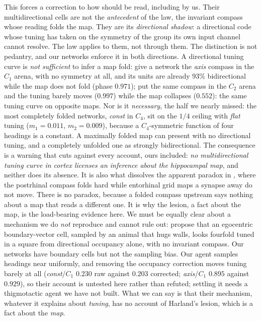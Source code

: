 \documentclass[9pt,lineno]{elife}
\begin{document}
This forces a correction to how \citet{zhang2022} should be read, including by us. Their
multidirectional cells are not the \emph{antecedent} of the law, the invariant compass whose reading
folds the map. They are its \emph{directional shadow}: a directional code whose tuning has taken on the
symmetry of the group its own input channel cannot resolve. The law applies to them, not through them.
The distinction is not pedantry, and our networks enforce it in both directions. A directional tuning
curve is \emph{not sufficient} to infer a map fold: give a network the \textit{axis} compass in the
$C_1$ arena, with no symmetry at all, and its units are already $93\%$ bidirectional while the map does
not fold (phase $0.971$); put the same compass in the $C_2$ arena and the tuning barely moves ($0.997$)
while the map collapses ($0.552$): the same tuning curve on opposite maps. Nor is it \emph{necessary},
the half we nearly missed: the most completely folded networks, \textit{const} in $C_4$, sit on the
$1/4$ ceiling with \emph{flat} tuning ($m_1 = 0.011$, $m_2 = 0.009$), because a $C_4$-symmetric function
of four headings is a constant. A maximally folded map can present with no directional tuning, and a
completely unfolded one as strongly bidirectional. The consequence is a warning that cuts against every
account, ours included: \emph{no multidirectional tuning curve in cortex licenses an inference about the
hippocampal map}, and neither does its absence. It is also what dissolves the apparent paradox in
\citet{lachance2024}, where the postrhinal compass folds hard while entorhinal grid maps a synapse away
do not move. There is no paradox, because a folded compass upstream says nothing about a map that
reads a different one. It is why the lesion, a fact about the map, is the load-bearing evidence here.
We must be equally clear about a mechanism we do \emph{not} reproduce and cannot rule out:
\citet{alexander2020} propose that an egocentric boundary-vector cell, sampled by an animal that hugs
walls, looks fourfold tuned in a square from directional occupancy alone, with no invariant compass.
Our networks have boundary cells but not the sampling bias. Our agent samples headings near uniformly,
and removing the occupancy correction moves tuning barely at all (\textit{const}/$C_1$ $0.230$ raw
against $0.203$ corrected; \textit{axis}/$C_1$ $0.895$ against $0.929$), so their account is untested
here rather than refuted; settling it needs a thigmotactic agent we have not built. What we
can say is that their mechanism, whatever it explains about \emph{tuning}, has no account of Harland's
lesion, which is a fact about the \emph{map}.
\end{document}
